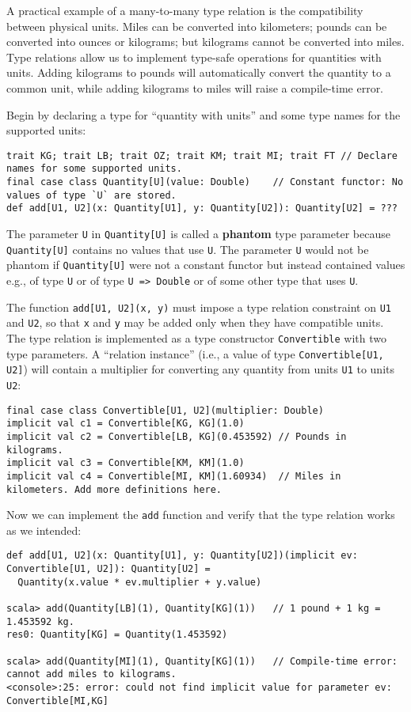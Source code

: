 A practical example of a many-to-many type
relation is the compatibility between physical units. Miles can be
converted into kilometers; pounds can be converted into ounces or
kilograms; but kilograms cannot be converted into miles. Type relations
allow us to implement type-safe operations for quantities with units.
Adding kilograms to pounds will automatically convert the quantity
to a common unit, while adding kilograms to miles will raise a compile-time
error.

Begin by declaring a type for \textsf{``}quantity with units\textsf{''} and some type
names for the supported units:
\begin{lstlisting}
trait KG; trait LB; trait OZ; trait KM; trait MI; trait FT // Declare names for some supported units.
final case class Quantity[U](value: Double)    // Constant functor: No values of type `U` are stored.
def add[U1, U2](x: Quantity[U1], y: Quantity[U2]): Quantity[U2] = ???
\end{lstlisting}
The parameter \lstinline!U! in \lstinline!Quantity[U]! is called
a \textbf{phantom} type parameter because
\lstinline!Quantity[U]! contains no values that use \lstinline!U!.
The parameter \lstinline!U! would not be phantom if \lstinline!Quantity[U]!
were not a constant functor
but instead contained values e.g., of type \lstinline!U! or of type
\lstinline!U => Double! or of some other type that uses \lstinline!U!. 

The function \lstinline!add[U1, U2](x, y)! must impose a type relation
constraint on \lstinline!U1! and \lstinline!U2!, so that \lstinline!x!
and \lstinline!y! may be added only when they have compatible units.
The type relation is implemented as a type constructor \lstinline!Convertible!
with two type parameters. A \textsf{``}relation instance\textsf{''} (i.e., a value
of type \lstinline!Convertible[U1, U2]!) will contain a multiplier
for converting any quantity from units \lstinline!U1! to units \lstinline!U2!:
\begin{lstlisting}
final case class Convertible[U1, U2](multiplier: Double)
implicit val c1 = Convertible[KG, KG](1.0)
implicit val c2 = Convertible[LB, KG](0.453592) // Pounds in kilograms.
implicit val c3 = Convertible[KM, KM](1.0)
implicit val c4 = Convertible[MI, KM](1.60934)  // Miles in kilometers. Add more definitions here.
\end{lstlisting}
Now we can implement the \lstinline!add! function and verify that
the type relation works as we intended:
\begin{lstlisting}
def add[U1, U2](x: Quantity[U1], y: Quantity[U2])(implicit ev: Convertible[U1, U2]): Quantity[U2] =
  Quantity(x.value * ev.multiplier + y.value)

scala> add(Quantity[LB](1), Quantity[KG](1))   // 1 pound + 1 kg = 1.453592 kg.
res0: Quantity[KG] = Quantity(1.453592)

scala> add(Quantity[MI](1), Quantity[KG](1))   // Compile-time error: cannot add miles to kilograms.
<console>:25: error: could not find implicit value for parameter ev: Convertible[MI,KG]
\end{lstlisting}

